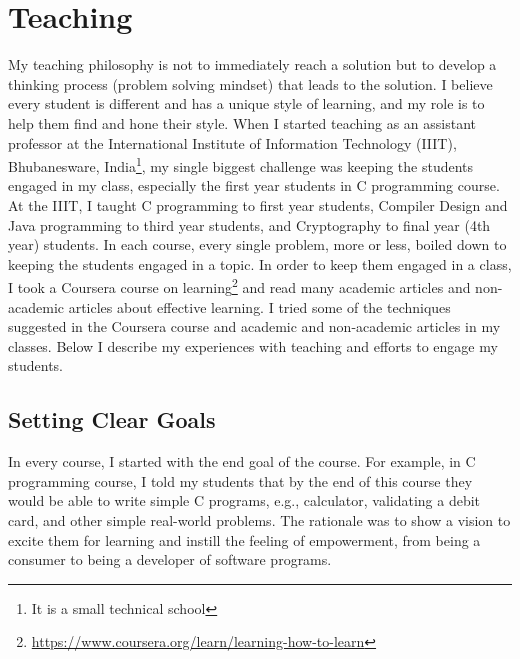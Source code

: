 \documentclass[a4paper]{article}
\begin{document}
\section{Teaching}
My teaching philosophy is not to immediately reach a solution but to develop a 
thinking process (problem solving mindset) that leads to the solution. I believe every 
student is different and has a unique style of learning, and my role is to help them find 
and hone their style. When I started teaching as an assistant professor at the International Institute of Information 
Technology (IIIT), Bhubanesware, India\footnote{It is a small technical school},
my single biggest challenge was keeping the students engaged in my class, especially the first year 
students in C programming course. At the IIIT, I taught C programming to 
first year students, Compiler Design and Java programming to third year students, and
Cryptography to final year (4th year) students. In each course, every single 
problem,  more or less, boiled down to keeping the students engaged in a topic. 
In order to keep them engaged in a class, I took a Coursera course on 
learning\footnote{\url{https://www.coursera.org/learn/learning-how-to-learn}} and 
read many academic articles and non-academic articles about effective learning.
I tried some of the techniques suggested in the Coursera course and 
academic and non-academic articles in my classes. Below I 
describe my experiences with teaching and efforts to engage my students. 


\subsection{Setting Clear Goals}
In every course, I started with the end goal of the course. For example, 
in C programming course, I told my students that by the end of this 
course they would be 
able to write simple C programs, e.g., calculator, 
validating a debit card, and other simple real-world problems. The rationale was 
to show a vision to excite them 
for learning and instill the feeling of empowerment, from
being a consumer to being a developer of software programs.
\end{document}
